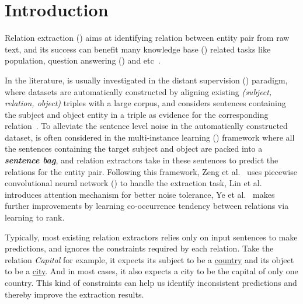 \section{Introduction}

Relation extraction (\RE) aims at identifying relation between entity pair from raw text, and its success can benefit  many knowledge base (\KB) related tasks like \KB population, question answering (\QA) and etc~\cite{suchanek2013advances}.

In the literature, \RE is usually investigated in the distant supervision (\DS) paradigm, where datasets are automatically constructed by aligning existing \KB \emph{(subject, relation, object)} triples with a large corpus, and considers sentences containing the subject and object entity in a triple as evidence for the corresponding relation~\cite{riedel2010modeling}.
To alleviate the sentence level noise in the automatically constructed dataset, \RE is often considered in the multi-instance learning (\MIL) framework where all the sentences containing the target subject and object are packed into a \textbf{\emph{sentence bag}}, and relation extractors take in these sentences to predict the relations for the entity pair. 
Following this framework, Zeng et al.~ uses piecewise convolutional neural network (\PCNN) to handle the extraction task, Lin et al.~ introduces attention mechanism for better noise tolerance,
Ye et al.~ makes further improvements by learning co-occurrence tendency between relations via learning to rank.

Typically, most existing relation extractors relies only on input sentences to make predictions, and ignores the constraints required by each relation.
Take the relation \emph{Capital} for example, it expects its subject to be a \underline{country} and its object to be a \underline{city}.
And in most cases, it also expects a city to be the capital of only one country.
This kind of constraints can help us identify inconsistent predictions and thereby improve the extraction results.

